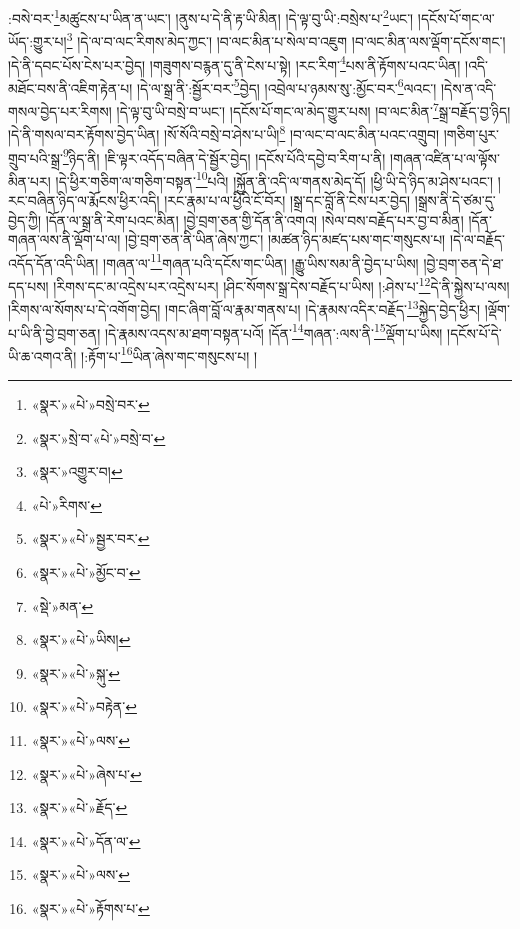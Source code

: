 :བསེ་བར་\footnote{«སྣར་»«པེ་»བསྲེ་བར་}མཚུངས་པ་ཡིན་ན་ཡང་། །ནུས་པ་དེ་ནི་རྟ་ཡི་མིན། །དེ་ལྟ་བུ་ཡི་:བསྲེས་པ་\footnote{«སྣར་»སྲེ་བ་«པེ་»བསྲེ་བ་}ཡང་། །དངོས་པོ་གང་ལ་ཡོད་:གྱུར་པ།\footnote{«སྣར་»འགྱུར་བ།} །དེ་ལ་བ་ལང་རིགས་མེད་ཀྱང་། །བ་ལང་མིན་པ་སེལ་བ་འཇུག །བ་ལང་མིན་ལས་ལྡོག་དངོས་གང་། །དེ་ནི་དབང་པོས་ངེས་པར་བྱེད། །གཟུགས་བརྙན་དུ་ནི་ངེས་པ་སྟེ། །རང་རིག་\footnote{«པེ་»རིགས་}པས་ནི་རྟོགས་པའང་ཡིན། །འདི་མཐོང་བས་ནི་འཇིག་རྟེན་པ། །དེ་ལ་སྒྲ་ནི་:སྦྱོར་བར་\footnote{«སྣར་»«པེ་»སྦྱར་བར་}བྱེད། །འབྲེལ་པ་ཉམས་སུ་:མྱོང་བར་\footnote{«སྣར་»«པེ་»མྱོང་བ་}ལའང་། །དེས་ན་འདི་གསལ་བྱེད་པར་རིགས། །དེ་ལྟ་བུ་ཡི་བསྲེ་བ་ཡང་། །དངོས་པོ་གང་ལ་མེད་གྱུར་པས། །བ་ལང་མིན་\footnote{«སྡེ་»མན་}སྒྲ་བརྗོད་བྱ་ཉིད། །དེ་ནི་གསལ་བར་རྟོགས་བྱེད་ཡིན། །སོ་སོའི་བསྲེ་བ་ཤེས་པ་ཡི།\footnote{«སྣར་»«པེ་»ཡིས།} །བ་ལང་བ་ལང་མིན་པའང་འགྲུབ། །གཅིག་པུར་གྲུབ་པའི་སྒྲ་\footnote{«སྣར་»«པེ་»སྐུ་}ཉིད་ནི། །ཇི་ལྟར་འདོད་བཞིན་དེ་སྦྱོར་བྱེད། །དངོས་པོའི་དབྱེ་བ་རིག་པ་ནི། །གཞན་འཛིན་པ་ལ་ལྟོས་མིན་པར། །དེ་ཕྱིར་གཅིག་ལ་གཅིག་བསྟན་\footnote{«སྣར་»«པེ་»བརྟེན་}པའི། །སྐྱོན་ནི་འདི་ལ་གནས་མེད་དོ། །ཕྱི་ཡི་དེ་ཉིད་མ་ཤེས་པའང་། །རང་བཞིན་ཉིད་ལ་རྨོངས་ཕྱིར་འདི། །རང་རྣམ་པ་ལ་ཕྱིའི་ངོ་བོར། །སྒྲ་དང་བློ་ནི་ངེས་པར་བྱེད། །སྒྲས་ནི་དེ་ཙམ་དུ་བྱེད་ཀྱི། །དོན་ལ་སྒྲ་ནི་རེག་པའང་མིན། །བྱེ་བྲག་ཅན་གྱི་དོན་ནི་འགའ། །སེལ་བས་བརྗོད་པར་བྱ་བ་མིན། །དོན་གཞན་ལས་ནི་ལྡོག་པ་ལ། །བྱེ་བྲག་ཅན་ནི་ཡིན་ཞེས་ཀྱང་། །མཚན་ཉིད་མཛད་པས་གང་གསུངས་པ། །དེ་ལ་བརྗོད་འདོད་དོན་འདི་ཡིན། །གཞན་ལ་\footnote{«སྣར་»«པེ་»ལས་}གཞན་པའི་དངོས་གང་ཡིན། །རྒྱུ་ཡིས་སམ་ནི་བྱེད་པ་ཡིས། །བྱེ་བྲག་ཅན་དེ་ཐ་དད་པས། །རིགས་དང་མ་འདྲེས་པར་འདྲེས་པར། །ཤིང་སོགས་སྒྲ་དེས་བརྗོད་པ་ཡིས། །:ཤེས་པ་\footnote{«སྣར་»«པེ་»ཞེས་པ་}དེ་ནི་སྐྱེས་པ་ལས། །རིགས་ལ་སོགས་པ་དེ་འགོག་བྱེད། །གང་ཞིག་བློ་ལ་རྣམ་གནས་པ། །དེ་རྣམས་འདིར་བརྗོད་\footnote{«སྣར་»«པེ་»རྗོད་}སྐྱེད་བྱེད་ཕྱིར། །ལྡོག་པ་ཡི་ནི་བྱེ་བྲག་ཅན། །དེ་རྣམས་འདས་མ་ཐག་བསྟན་པའོ། །དོན་\footnote{«སྣར་»«པེ་»དོན་ལ་}གཞན་:ལས་ནི་\footnote{«སྣར་»«པེ་»ལས་}ལྡོག་པ་ཡིས། །དངོས་པོ་དེ་ཡི་ཆ་འགའ་ནི། །:རྟོག་པ་\footnote{«སྣར་»«པེ་»རྟོགས་པ་}ཡིན་ཞེས་གང་གསུངས་པ། །
